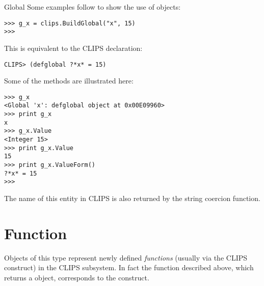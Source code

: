 \begin{classdesc*}{Global}
Some examples follow to show the use of  objects:

\begin{verbatim}
>>> g_x = clips.BuildGlobal("x", 15)
>>>
\end{verbatim}

This is equivalent to the CLIPS declaration:

\begin{verbatim}
CLIPS> (defglobal ?*x* = 15)
\end{verbatim}

Some of the  methods are illustrated here:

\begin{verbatim}
>>> g_x
<Global 'x': defglobal object at 0x00E09960>
>>> print g_x
x
>>> g_x.Value
<Integer 15>
>>> print g_x.Value
15
>>> print g_x.ValueForm()
?*x* = 15
>>>
\end{verbatim}

The name of this entity in CLIPS is also returned by the string coercion
function.

\end{classdesc*}



\section{Function\label{pyclips-cl-Function}}

Objects of this type represent newly defined \emph{functions}
(usually via the CLIPS  construct) in the CLIPS
subsystem. In fact the  function described
above, which returns a  object, corresponds to the
 construct.

